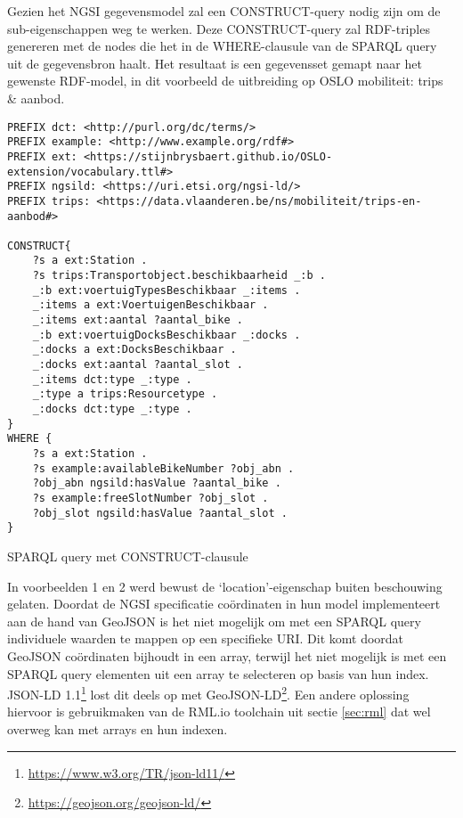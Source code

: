 Gezien het NGSI gegevensmodel zal een CONSTRUCT-query nodig zijn om de sub-eigenschappen weg te werken. Deze CONSTRUCT-query zal RDF-triples genereren met de nodes die het in de WHERE-clausule van de SPARQL query uit de gegevensbron haalt. Het resultaat is een gegevensset gemapt naar het gewenste RDF-model, in dit voorbeeld de uitbreiding op OSLO mobiliteit: trips \& aanbod. 

\begin{code}
\begin{verbatim}
PREFIX dct: <http://purl.org/dc/terms/>
PREFIX example: <http://www.example.org/rdf#>
PREFIX ext: <https://stijnbrysbaert.github.io/OSLO-extension/vocabulary.ttl#>
PREFIX ngsild: <https://uri.etsi.org/ngsi-ld/>
PREFIX trips: <https://data.vlaanderen.be/ns/mobiliteit/trips-en-aanbod#>

CONSTRUCT{
    ?s a ext:Station .
    ?s trips:Transportobject.beschikbaarheid _:b .
    _:b ext:voertuigTypesBeschikbaar _:items .
    _:items a ext:VoertuigenBeschikbaar .
    _:items ext:aantal ?aantal_bike .
    _:b ext:voertuigDocksBeschikbaar _:docks .
    _:docks a ext:DocksBeschikbaar .
    _:docks ext:aantal ?aantal_slot .
    _:items dct:type _:type .
    _:type a trips:Resourcetype .
    _:docks dct:type _:type .
}
WHERE {
    ?s a ext:Station .
    ?s example:availableBikeNumber ?obj_abn .
    ?obj_abn ngsild:hasValue ?aantal_bike .
    ?s example:freeSlotNumber ?obj_slot .
    ?obj_slot ngsild:hasValue ?aantal_slot .
}
\end{verbatim}
\caption{SPARQL query met CONSTRUCT-clausule}
\label{code:construct}
\end{code}

In voorbeelden 1 en 2 werd bewust de `location'-eigenschap buiten beschouwing gelaten. Doordat de NGSI specificatie coördinaten in hun model implementeert aan de hand van GeoJSON is het niet mogelijk om met een SPARQL query individuele waarden te mappen op een specifieke URI. Dit komt doordat GeoJSON coördinaten bijhoudt in een array, terwijl het niet mogelijk is met een SPARQL query elementen uit een array te selecteren op basis van hun index. JSON-LD 1.1\footnote{\url{https://www.w3.org/TR/json-ld11/}} lost dit deels op met GeoJSON-LD\footnote{\url{https://geojson.org/geojson-ld/}}.
Een andere oplossing hiervoor is gebruikmaken van de RML.io toolchain uit sectie \ref{sec:rml} dat wel overweg kan met arrays en hun indexen.

